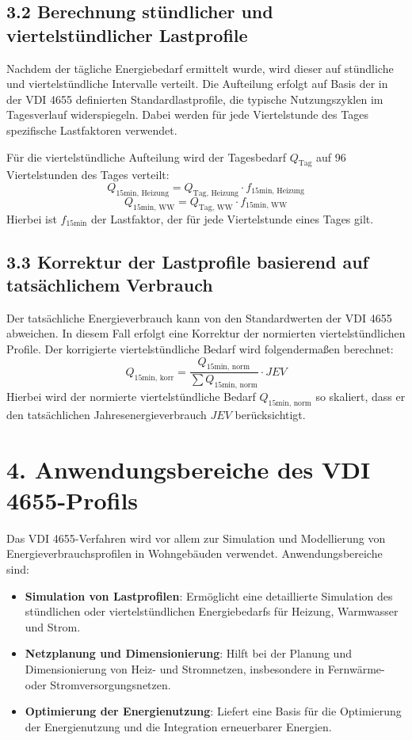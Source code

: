\documentclass{article}
\begin{document}
\subsection*{3.2 Berechnung stündlicher und viertelstündlicher Lastprofile}
Nachdem der tägliche Energiebedarf ermittelt wurde, wird dieser auf stündliche und viertelstündliche Intervalle verteilt. Die Aufteilung erfolgt auf Basis der in der VDI 4655 definierten Standardlastprofile, die typische Nutzungszyklen im Tagesverlauf widerspiegeln. Dabei werden für jede Viertelstunde des Tages spezifische Lastfaktoren verwendet.

Für die viertelstündliche Aufteilung wird der Tagesbedarf \( Q_{\text{Tag}} \) auf 96 Viertelstunden des Tages verteilt:
\[
Q_{\text{15min, Heizung}} = Q_{\text{Tag, Heizung}} \cdot f_{\text{15min, Heizung}}
\]
\[
Q_{\text{15min, WW}} = Q_{\text{Tag, WW}} \cdot f_{\text{15min, WW}}
\]
\noindent
Hierbei ist \( f_{\text{15min}} \) der Lastfaktor, der für jede Viertelstunde eines Tages gilt.

\subsection*{3.3 Korrektur der Lastprofile basierend auf tatsächlichem Verbrauch}
Der tatsächliche Energieverbrauch kann von den Standardwerten der VDI 4655 abweichen. In diesem Fall erfolgt eine Korrektur der normierten viertelstündlichen Profile. Der korrigierte viertelstündliche Bedarf wird folgendermaßen berechnet:
\[
Q_{\text{15min, korr}} = \frac{Q_{\text{15min, norm}}}{\sum Q_{\text{15min, norm}}} \cdot JEV
\]
Hierbei wird der normierte viertelstündliche Bedarf \( Q_{\text{15min, norm}} \) so skaliert, dass er den tatsächlichen Jahresenergieverbrauch \( JEV \) berücksichtigt.

\section*{4. Anwendungsbereiche des VDI 4655-Profils}
Das VDI 4655-Verfahren wird vor allem zur Simulation und Modellierung von Energieverbrauchsprofilen in Wohngebäuden verwendet. Anwendungsbereiche sind:

\begin{itemize}
    \item \textbf{Simulation von Lastprofilen}: Ermöglicht eine detaillierte Simulation des stündlichen oder viertelstündlichen Energiebedarfs für Heizung, Warmwasser und Strom.
    \item \textbf{Netzplanung und Dimensionierung}: Hilft bei der Planung und Dimensionierung von Heiz- und Stromnetzen, insbesondere in Fernwärme- oder Stromversorgungsnetzen.
    \item \textbf{Optimierung der Energienutzung}: Liefert eine Basis für die Optimierung der Energienutzung und die Integration erneuerbarer Energien.
\end{itemize}
\end{document}
